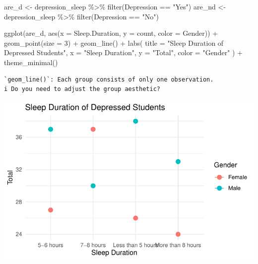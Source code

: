 \documentclass[
  letterpaper,
  DIV=11,
  numbers=noendperiod]{scrartcl}
\newenvironment{Shaded}{\begin{snugshade}}{\end{snugshade}}
\newcommand{\AttributeTok}[1]{\textcolor[rgb]{0.40,0.45,0.13}{#1}}
\newcommand{\DecValTok}[1]{\textcolor[rgb]{0.68,0.00,0.00}{#1}}
\newcommand{\FunctionTok}[1]{\textcolor[rgb]{0.28,0.35,0.67}{#1}}
\newcommand{\NormalTok}[1]{\textcolor[rgb]{0.00,0.23,0.31}{#1}}
\newcommand{\OtherTok}[1]{\textcolor[rgb]{0.00,0.23,0.31}{#1}}
\newcommand{\SpecialCharTok}[1]{\textcolor[rgb]{0.37,0.37,0.37}{#1}}
\newcommand{\StringTok}[1]{\textcolor[rgb]{0.13,0.47,0.30}{#1}}
\begin{document}
\begin{Shaded}
\begin{Highlighting}[]
\NormalTok{are\_d }\OtherTok{\textless{}{-}}\NormalTok{ depression\_sleep }\SpecialCharTok{\%\textgreater{}\%} \FunctionTok{filter}\NormalTok{(Depression }\SpecialCharTok{==} \StringTok{"Yes"}\NormalTok{)}
\NormalTok{are\_nd }\OtherTok{\textless{}{-}}\NormalTok{ depression\_sleep }\SpecialCharTok{\%\textgreater{}\%} \FunctionTok{filter}\NormalTok{(Depression }\SpecialCharTok{==} \StringTok{"No"}\NormalTok{)}

\FunctionTok{ggplot}\NormalTok{(are\_d, }\FunctionTok{aes}\NormalTok{(}\AttributeTok{x =}\NormalTok{ Sleep.Duration, }\AttributeTok{y =}\NormalTok{ count, }\AttributeTok{color =}\NormalTok{ Gender)) }\SpecialCharTok{+}
  \FunctionTok{geom\_point}\NormalTok{(}\AttributeTok{size =} \DecValTok{3}\NormalTok{) }\SpecialCharTok{+}    
  \FunctionTok{geom\_line}\NormalTok{() }\SpecialCharTok{+}       
  \FunctionTok{labs}\NormalTok{(}
    \AttributeTok{title =} \StringTok{"Sleep Duration of Depressed Students"}\NormalTok{,}
    \AttributeTok{x =} \StringTok{"Sleep Duration"}\NormalTok{,}
    \AttributeTok{y =} \StringTok{"Total"}\NormalTok{,}
    \AttributeTok{color =} \StringTok{"Gender"}
\NormalTok{  ) }\SpecialCharTok{+}
  \FunctionTok{theme\_minimal}\NormalTok{() }
\end{Highlighting}
\end{Shaded}

\begin{verbatim}
`geom_line()`: Each group consists of only one observation.
i Do you need to adjust the group aesthetic?
\end{verbatim}

\includegraphics{Data_files/figure-pdf/unnamed-chunk-6-1.pdf}
\end{document}
